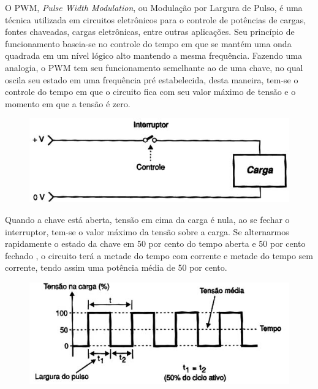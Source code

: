 O PWM, \textit{Pulse Width Modulation}, ou Modulação por Largura de Pulso, é uma técnica utilizada em circuitos eletrônicos para o controle de potências de cargas, fontes chaveadas, cargas eletrônicas, entre outras aplicações. Seu princípio de funcionamento baseia-se no controle do tempo em que se mantém uma onda quadrada em um nível lógico alto mantendo a mesma frequência.
Fazendo uma analogia, o PWM tem seu funcionamento semelhante ao de uma chave, no qual oscila seu estado em uma frequência pré estabelecida, desta maneira, tem-se o controle do tempo em que o circuito fica com seu valor máximo de tensão e o momento em que a tensão é zero. 

\FloatBarrier
\begin{figure}[!htbp]
	\centering
	\includegraphics[scale=0.7]{imagens/PWM1}
	\caption{ }%
	
	\label{fig:PWM1}
\end{figure}
\FloatBarrier

Quando a chave está aberta, tensão em cima da carga é nula, ao se fechar o interruptor, tem-se o valor máximo da tensão sobre a carga. Se alternarmos rapidamente o estado da chave em 50 por cento do tempo aberta e 50 por cento fechado , o circuito terá a metade do tempo com corrente e metade do tempo sem corrente, tendo assim uma potência média de 50 por cento.

\FloatBarrier
\begin{figure}[!htbp]
	\centering
	\includegraphics[scale=0.7]{imagens/PWM2}
	\caption{ }%
	
	\label{fig:PWM2}
\end{figure}
\FloatBarrier

